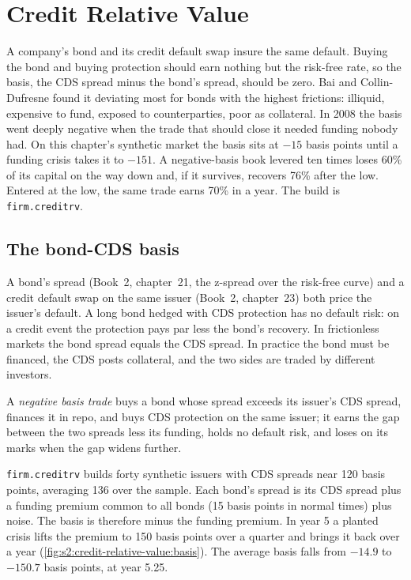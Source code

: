 \chapter{Credit Relative Value}\label{ch:s2:credit-relative-value}

A company's bond and its credit default swap insure the same default. Buying the bond and buying protection should earn nothing but the risk-free
rate, so the basis, the CDS spread minus the bond's spread, should be zero. Bai and Collin-Dufresne found it deviating most for bonds with the
highest frictions: illiquid, expensive to fund, exposed to counterparties, poor as collateral. In 2008 the basis went deeply negative when the trade
that should close it needed funding nobody had. On this chapter's synthetic market the basis sits at $-15$ basis points until a funding crisis takes
it to $-151$. A negative-basis book levered ten times loses 60\% of its capital on the way down and, if it survives, recovers 76\% after the low.
Entered at the low, the same trade earns 70\% in a year. The build is \texttt{firm.creditrv}.

\section{The bond-CDS basis}

A bond's spread (Book~2, chapter~21, the z-spread over the risk-free curve) and a credit default swap on the same issuer (Book~2, chapter~23) both
price the issuer's default. A long bond hedged with CDS protection has no default risk: on a credit event the protection pays par less the bond's
recovery. In frictionless markets the bond spread equals the CDS spread. In practice the bond must be financed, the CDS posts collateral, and the
two sides are traded by different investors.

\begin{definition}\label{def:s2:credit-relative-value:negbasis}
A \emph{negative basis trade} buys a bond whose spread exceeds its issuer's CDS spread, finances it in repo, and buys CDS
protection on the same issuer; it earns the gap between the two spreads less its funding, holds no default risk, and loses on its marks when the gap
widens further.
\end{definition}

\texttt{firm.creditrv} builds forty synthetic issuers with CDS spreads near 120 basis points, averaging 136 over the sample. Each bond's spread is its
CDS spread plus a funding premium common to all bonds (15 basis points in normal times) plus noise. The basis is therefore minus the funding premium.
In year 5 a planted crisis lifts the premium to 150 basis points over a quarter and brings it back over a year
(\cref{fig:s2:credit-relative-value:basis}). The average basis falls from $-14.9$ to $-150.7$ basis points, at year 5.25.

